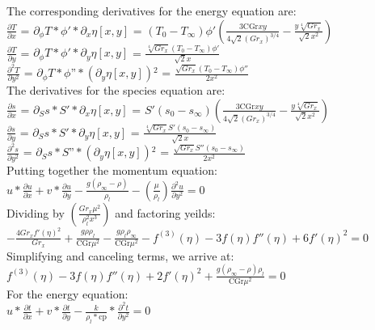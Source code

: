 \documentclass[letterpaper, 10pt]{article}
\begin{document}
The corresponding derivatives for the energy equation are:\\
$\frac{\partial T}{\partial x}$ = $\partial _{\phi }T*\phi '*\partial _x\eta [x,y]$ = 
$(T_0-T_\infty) \phi ' \left(\frac{3 \text{CGr} x y}{4 \sqrt{2} \left(Gr_x\right)^{3/4}}-\frac{y \sqrt[4]{Gr_x}}{\sqrt{2} x^2}\right)$\\
$\frac{\partial T}{\partial y}$ = $ \partial _{\phi }T*\phi '*\partial _y\eta [x,y]$ = $\frac{\sqrt[4]{Gr_x} (T_0-T_\infty) \phi '}{\sqrt{2} x}$\\
$\frac{\partial^2 T}{\partial y^2}$ = $\partial _{\phi }T*\phi \text{''}*\left(\partial _y\eta [x,y]\right){}^2$ = $\frac{\sqrt{Gr_x} (T_0-T_\infty) \phi ''}{2 x^2}$\\

The derivatives for the species equation are:\\
$\frac{\partial s}{\partial x}$ = $\partial _Ss * S'*\partial _x\eta [x,y]$ = $S' (s_0-s_\infty) \left(\frac{3 \text{CGr} x y}{4 \sqrt{2} \left(Gr_x\right)^{3/4}}-\frac{y \sqrt[4]{Gr_x}}{\sqrt{2} x^2}\right)$\\
$\frac{\partial s}{\partial y}$ = $\partial _Ss * S'*\partial _y\eta [x,y]$ = $\frac{\sqrt[4]{Gr_x} S' (s_0-s_\infty)}{\sqrt{2} x}$\\
$\frac{\partial^2 s}{\partial y^2}$ = $\partial _Ss* S\text{''}*\left(\partial _y\eta [x,y]\right){}^2$ = $\frac{\sqrt{Gr_x} S'' (s_0-s_\infty)}{2 x^2}$\\

Putting together the momentum equation:\\
$u*\frac{\partial u}{\partial x}+v*\frac{\partial u}{\partial y}-\frac{g(\rho_\infty -\rho )}{\rho_l}-\left(\frac{\mu }{\rho_l}\right)\frac{\partial^2 u}{\partial y^2} = 0$\\

Dividing by $\left(\frac{Gr_x\mu ^2}{ \rho_l^2 x^3}\right)$ and factoring yeilds:\\
$-\frac{4 Gr_x f'(\eta )^2}{Gr_x}+\frac{g \rho  \rho_l}{\text{CGr} \mu^2}-\frac{g \rho_l \rho_\infty}{\text{CGr} \mu^2}-f^{(3)}(\eta )-3 f(\eta ) f''(\eta )+6 f'(\eta )^2 = 0$\\

Simplifying and canceling terms, we arrive at:\\
$f^{(3)}(\eta )-3 f(\eta ) f''(\eta )+2 f'(\eta )^2 + \frac{g (\rho_\infty - \rho) \rho_l}{\text{CGr} \mu^2} = 0 $\\

For the energy equation:\\
$u*\frac{\partial t}{\partial x}+v*\frac{\partial t}{\partial y}-\frac{k}{\rho_l*\text{cp}}*\frac{\partial^2 t}{\partial y^2} = 0$\\
\end{document}
